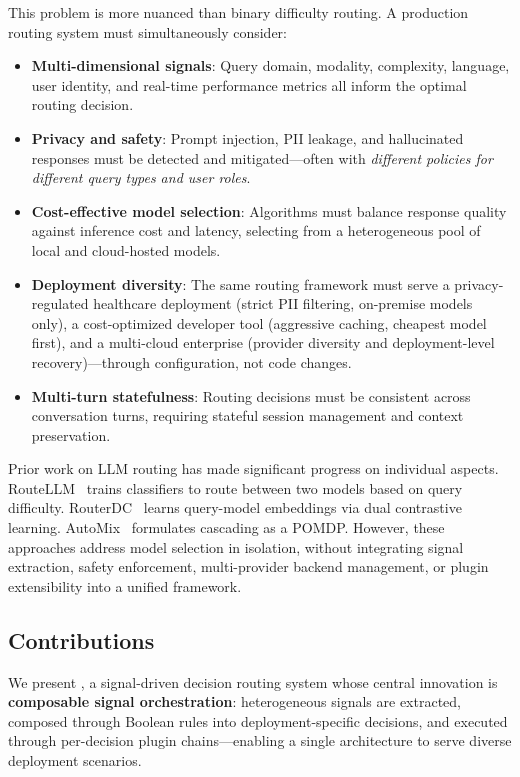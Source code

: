This problem is more nuanced than binary difficulty routing.
A production routing system must simultaneously consider:
\begin{itemize}[leftmargin=*]
  \item \textbf{Multi-dimensional signals}: Query domain, modality, complexity, language, user identity, and real-time performance metrics all inform the optimal routing decision.
  \item \textbf{Privacy and safety}: Prompt injection, PII leakage, and hallucinated responses must be detected and mitigated---often with \emph{different policies for different query types and user roles}.
  \item \textbf{Cost-effective model selection}: Algorithms must balance response quality against inference cost and latency, selecting from a heterogeneous pool of local and cloud-hosted models.
  \item \textbf{Deployment diversity}: The same routing framework must serve a privacy-regulated healthcare deployment (strict PII filtering, on-premise models only), a cost-optimized developer tool (aggressive caching, cheapest model first), and a multi-cloud enterprise (provider diversity and deployment-level recovery)---through configuration, not code changes.
  \item \textbf{Multi-turn statefulness}: Routing decisions must be consistent across conversation turns, requiring stateful session management and context preservation.
\end{itemize}

Prior work on LLM routing has made significant progress on individual aspects.
RouteLLM~\cite{ong2024routellm} trains classifiers to route between two models based on query difficulty.
RouterDC~\cite{chen2024routerdc} learns query-model embeddings via dual contrastive learning.
AutoMix~\cite{aggarwal2023automix} formulates cascading as a POMDP.
However, these approaches address model selection in isolation, without integrating signal extraction, safety enforcement, multi-provider backend management, or plugin extensibility into a unified framework.

\subsection{Contributions}

We present \sysname{}, a signal-driven decision routing system whose central innovation is \textbf{composable signal orchestration}: heterogeneous signals are extracted, composed through Boolean rules into deployment-specific decisions, and executed through per-decision plugin chains---enabling a single architecture to serve diverse deployment scenarios.

